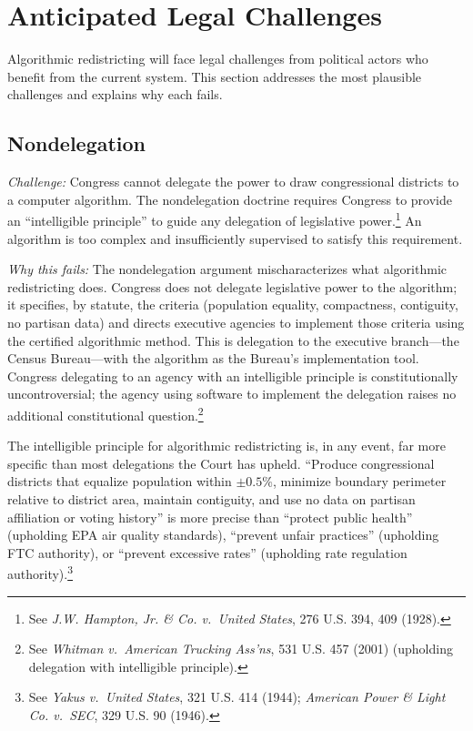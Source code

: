 \section{Anticipated Legal Challenges}
\label{sec:challenges}

Algorithmic redistricting will face legal challenges from political actors who benefit from the current system. This section addresses the most plausible challenges and explains why each fails.

\subsection{Nondelegation}

\textit{Challenge:} Congress cannot delegate the power to draw congressional districts to a computer algorithm. The nondelegation doctrine requires Congress to provide an ``intelligible principle'' to guide any delegation of legislative power.\footnote{See \textit{J.W. Hampton, Jr. \& Co. v.\ United States}, 276 U.S. 394, 409 (1928).} An algorithm is too complex and insufficiently supervised to satisfy this requirement.

\textit{Why this fails:} The nondelegation argument mischaracterizes what algorithmic redistricting does. Congress does not delegate legislative power to the algorithm; it specifies, by statute, the criteria (population equality, compactness, contiguity, no partisan data) and directs executive agencies to implement those criteria using the certified algorithmic method. This is delegation to the executive branch---the Census Bureau---with the algorithm as the Bureau's implementation tool. Congress delegating to an agency with an intelligible principle is constitutionally uncontroversial; the agency using software to implement the delegation raises no additional constitutional question.\footnote{See \textit{Whitman v.\ American Trucking Ass'ns}, 531 U.S. 457 (2001) (upholding delegation with intelligible principle).}

The intelligible principle for algorithmic redistricting is, in any event, far more specific than most delegations the Court has upheld. ``Produce congressional districts that equalize population within $\pm 0.5\%$, minimize boundary perimeter relative to district area, maintain contiguity, and use no data on partisan affiliation or voting history'' is more precise than ``protect public health'' (upholding EPA air quality standards), ``prevent unfair practices'' (upholding FTC authority), or ``prevent excessive rates'' (upholding rate regulation authority).\footnote{See \textit{Yakus v.\ United States}, 321 U.S. 414 (1944); \textit{American Power \& Light Co. v.\ SEC}, 329 U.S. 90 (1946).}

